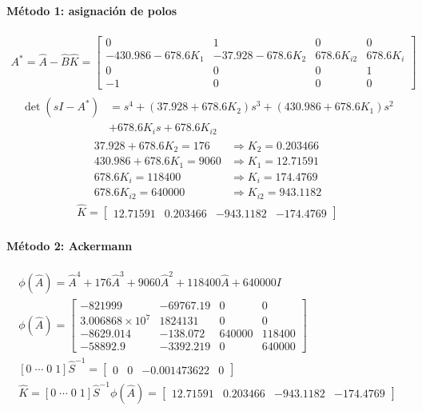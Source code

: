 \documentclass[11pt]{article}
\begin{document}
\paragraph{Método 1: asignación de polos}
\begin{gather*}
A^*=\hat A-\hat B\hat K=\begin{bmatrix}0&1&0&0\\-430.986-678.6K_1&-37.928-678.6K_2&678.6K_{i2}&678.6K_i\\0&0&0&1\\-1&0&0&0\end{bmatrix}
\end{gather*}
\begin{gather*}
\begin{aligned}\det(sI-A^*)&=s^{4}+(37.928+678.6K_2)s^{3}+(430.986+678.6K_1)s^{2}\\&+678.6K_is+678.6K_{i2}\end{aligned}
\end{gather*}
\begin{align*}
37.928+678.6K_2=176&\Rightarrow K_2=0.203466\\
430.986+678.6K_1=9060&\Rightarrow K_1=12.71591\\
678.6K_i=118400&\Rightarrow K_i=174.4769\\
678.6K_{i2}=640000&\Rightarrow K_{i2}=943.1182
\end{align*}
\begin{gather*}
\hat K=\begin{bmatrix}12.71591 & 0.203466 & -943.1182 & -174.4769\end{bmatrix}
\end{gather*}
\paragraph{Método 2: Ackermann}
\begin{gather*}
\phi(\hat A)=\hat A^{4} + 176\hat A^{3} + 9060\hat A^{2} + 118400\hat A + 640000I\\
\phi(\hat A)=\begin{bmatrix}-821999 & -69767.19 & 0 & 0 \\ 3.006868\times10^{7} & 1824131 & 0 & 0 \\ -8629.014 & -138.072 & 640000 & 118400 \\ -58892.9 & -3392.219 & 0 & 640000\end{bmatrix}\\
[0\;\cdots\;0\;1]\hat S^{-1}=\begin{bmatrix}0 & 0 & -0.001473622 & 0\end{bmatrix}\\
\hat K=[0\;\cdots\;0\;1]\hat S^{-1}\phi(\hat A)=\begin{bmatrix}12.71591 & 0.203466 & -943.1182 & -174.4769\end{bmatrix}
\end{gather*}
\end{document}
